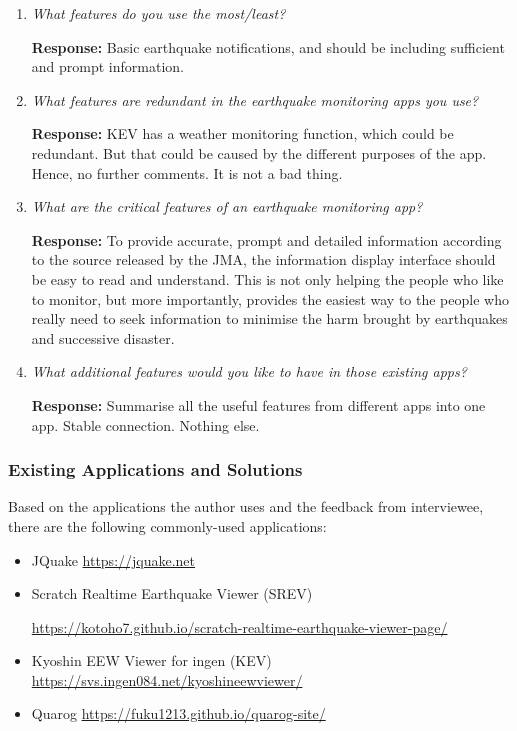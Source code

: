 \documentclass{article}
\begin{document}
\begin{enumerate}
    \item \textit{What features do you use the most/least?}
    
    \textbf{Response:} Basic earthquake notifications, and should be including sufficient and prompt information.

    \item \textit{What features are redundant in the earthquake monitoring apps you use?}
    
    \textbf{Response:} KEV has a weather monitoring function, which could be redundant. But that could be caused by the different purposes of the app. Hence, no further comments. It is not a bad thing.

    \item \textit{What are the critical features of an earthquake monitoring app?}
    
    \textbf{Response:} To provide accurate, prompt and detailed information according to the source released by the JMA, the information display interface should be easy to read and understand. This is not only helping the people who like to monitor, but more importantly, provides the easiest way to the people who really need to seek information to minimise the harm brought by earthquakes and successive disaster.

    \item \textit{What additional features would you like to have in those existing apps?}
    
    \textbf{Response:} Summarise all the useful features from different apps into one app. Stable connection. Nothing else.
    

\end{enumerate}

\subsubsection{Existing Applications and Solutions}

Based on the applications the author uses and the feedback from interviewee, there are the following commonly-used applications:
\begin{itemize}
    \item JQuake \url{https://jquake.net}
    \item Scratch Realtime Earthquake Viewer (SREV)

          \url{https://kotoho7.github.io/scratch-realtime-earthquake-viewer-page/}
    \item Kyoshin EEW Viewer for ingen (KEV) \url{https://svs.ingen084.net/kyoshineewviewer/}
    \item Quarog \url{https://fuku1213.github.io/quarog-site/}
\end{itemize}
\end{document}
